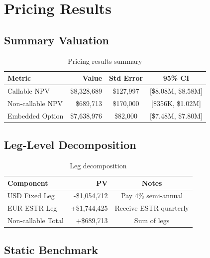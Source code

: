 \documentclass[10pt,a4paper]{article}
\begin{document}
\newpage

\section{Pricing Results}

\subsection{Summary Valuation}

\begin{table}[H]
\centering
\begin{tabular}{lrcc}
\toprule
\textbf{Metric} & \textbf{Value} & \textbf{Std Error} & \textbf{95\% CI} \\
\midrule
Callable NPV & \$8,328,689 & \$127,997 & [\$8.08M, \$8.58M] \\
Non-callable NPV & \$689,713 & \$170,000 & [\$356K, \$1.02M] \\
Embedded Option & \$7,638,976 & \$82,000 & [\$7.48M, \$7.80M] \\
\bottomrule
\end{tabular}
\caption{Pricing results summary}
\end{table}

\subsection{Leg-Level Decomposition}

\begin{table}[H]
\centering
\begin{tabular}{lrc}
\toprule
\textbf{Component} & \textbf{PV} & \textbf{Notes} \\
\midrule
USD Fixed Leg & -\$1,054,712 & Pay 4\% semi-annual \\
EUR ESTR Leg & +\$1,744,425 & Receive ESTR quarterly \\
\midrule
Non-callable Total & +\$689,713 & Sum of legs \\
\bottomrule
\end{tabular}
\caption{Leg decomposition}
\end{table}

\subsection{Static Benchmark}
\end{document}
